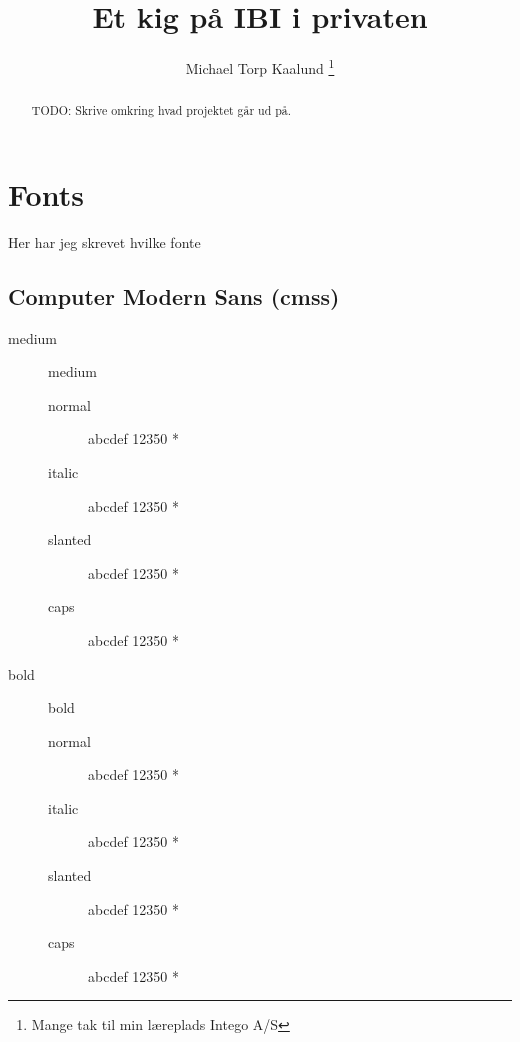 \documentclass[12pt,a4paper]{report}
\title{Et kig på IBI i privaten}
\author{Michael Torp Kaalund \thanks{Mange tak til min læreplads Intego A/S}}
\begin{document}
    
    

    \begin{abstract}
        TODO: Skrive omkring hvad projektet går ud på.
    \end{abstract}

    \tableofcontents

    \chapter{Fonts}
    Her har jeg skrevet hvilke fonte

    
    \section{Computer Modern Sans (cmss)}
    \begin{description}
        \item [medium] medium
        \begin{description}
            \item [normal]  abcdef 12350 *
            \item [italic]  abcdef 12350 *
            \item [slanted]  abcdef 12350 *
            \item [caps]  abcdef 12350 *
        \end{description}
        
        \item [bold] bold
        \begin{description}
            \item [normal]  abcdef 12350 *
            \item [italic]  abcdef 12350 *
            \item [slanted]  abcdef 12350 *
            \item [caps]  abcdef 12350 *
        \end{description}
        

\end{description}
\end{document}
